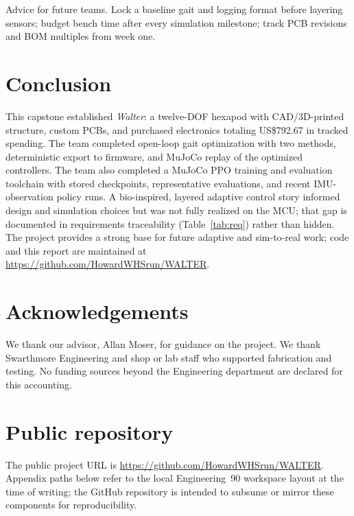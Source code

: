 \documentclass[11pt]{article}
\begin{document}
Advice for future teams. Lock a baseline gait and logging format before layering sensors; budget bench time after every simulation milestone; track PCB revisions and BOM multiples from week one.

\section{Conclusion}

This capstone established \emph{Walter}: a twelve-DOF hexapod with CAD/3D-printed structure, custom PCBs, and purchased electronics totaling US\$792.67 in tracked spending. The team completed open-loop gait optimization with two methods, deterministic export to firmware, and MuJoCo replay of the optimized controllers. The team also completed a MuJoCo PPO training and evaluation toolchain with stored checkpoints, representative evaluations, and recent IMU-observation policy runs. A bio-inspired, layered adaptive control story informed design and simulation choices but was not fully realized on the MCU; that gap is documented in requirements traceability (Table~\ref{tab:req}) rather than hidden. The project provides a strong base for future adaptive and sim-to-real work; code and this report are maintained at \url{https://github.com/HowardWHSrun/WALTER}.

\section*{Acknowledgements}
We thank our advisor, Allan Moser, for guidance on the project. We thank Swarthmore Engineering and shop or lab staff who supported fabrication and testing. No funding sources beyond the Engineering department are declared for this accounting.




\appendix
\section{Public repository}
\label{app:github}
The public project URL is \url{https://github.com/HowardWHSrun/WALTER}. Appendix paths below refer to the local Engineering~90 workspace layout at the time of writing; the GitHub repository is intended to subsume or mirror these components for reproducibility.
\end{document}
